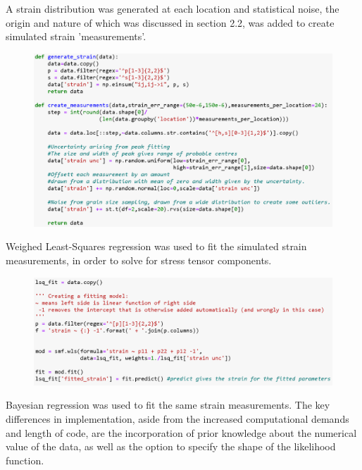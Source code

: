 A strain distribution was generated at each location and statistical noise, the origin and nature of which was discussed in section 2.2, was added to create simulated strain 'measurements'.

 \begin{figure}[H]
 	\centering
 	\includegraphics[width=0.8\linewidth]{chapters/chapter02/fig02/generatemeasurements.png}
 \end{figure}

Weighed Least-Squares regression was used to fit the simulated strain measurements, in order to solve for stress tensor components.



 \begin{figure}[H]
 	\centering
 	\includegraphics[width=0.8\linewidth]{chapters/chapter02/fig02/LSQ.png}
 \end{figure}

Bayesian regression was used to fit the same strain measurements. The key differences in implementation, aside from the increased computational demands and length of code, are the incorporation of prior knowledge about the numerical value of the data, as well as the option to specify the shape of the likelihood function. 

